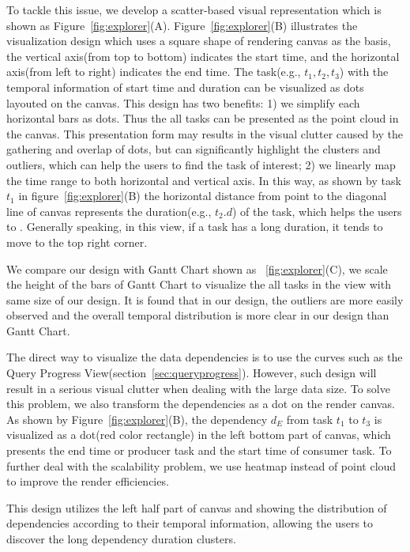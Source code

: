 To tackle this issue, we develop a scatter-based visual representation which is shown as Figure~\ref{fig:explorer}(A). Figure~\ref{fig:explorer}(B) illustrates the visualization design which uses a square shape of rendering canvas as the basis, the vertical axis(from top to bottom) indicates the start time, and the horizontal axis(from left to right) indicates the end time.
The task(e.g., $t_1, t_2, t_3$) with the temporal information of start time and duration can be visualized as dots layouted on the canvas. 
This design has two benefits: 1) we simplify each horizontal bars as dots. Thus the all tasks can be presented as the point cloud in the canvas. This presentation form may results in the visual clutter caused by the gathering and overlap of dots, but can significantly highlight the clusters and outliers, which can help the users to find the task of interest; 2) we linearly map the time range to both horizontal and vertical axis. In this way, as shown by task $t_1$ in figure~\ref{fig:explorer}(B) the horizontal distance from point to the diagonal line of canvas represents the duration(e.g., $t_2.d$) of the task, which helps the users to . Generally speaking, in this view, if a task has a long duration, it tends to move to the top right corner. 

We compare our design with Gantt Chart shown as ~\ref{fig:explorer}(C), we scale the height of the bars of Gantt Chart to visualize the all tasks in the view with same size of our design. It is found that in our design, the outliers are more easily observed and the overall temporal distribution is more clear in our design than Gantt Chart.

The direct way to visualize the data dependencies is to use the curves such as the Query Progress View(section~\ref{sec:queryprogress}). However, such design will result in a serious visual clutter when dealing with the large data size. To solve this problem, we also transform the dependencies as a dot on the render canvas. As shown by Figure~\ref{fig:explorer}(B), the dependency $d_E$ from task $t_1$ to $t_3$ is visualized as a dot(red color rectangle) in the left bottom part of canvas, which presents the end time or producer task and the start time of consumer task.  To further deal with the scalability problem, we use heatmap instead of point cloud to improve the render efficiencies.

This design utilizes the left half part of canvas and showing the distribution of dependencies according to their temporal information, allowing the users to discover the long dependency duration clusters. 

